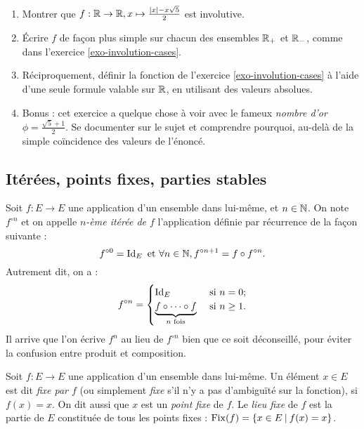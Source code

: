 \begin{exercice}\label{exo-involution-abs}
\begin{enumerate}
\item Montrer que $f : \mathbb{R}\to \mathbb{R}, x\mapsto \frac{|x|-x\sqrt 5}{2}$ est involutive.
\item Écrire $f$ de façon plus simple sur chacun des ensembles $\mathbb{R}_+$ et $\mathbb{R}_-$, comme dans l'exercice \ref{exo-involution-cases}.
\item Réciproquement, définir la fonction de l'exercice \ref{exo-involution-cases} à l'aide d'une seule formule valable sur $\mathbb{R}$, en utilisant des valeurs absolues.
\item Bonus : cet exercice a quelque chose à voir avec le fameux \emph{nombre d'or} $\phi = \frac{\sqrt 5 +1}{2}$. Se documenter sur le sujet et comprendre pourquoi, au-delà de la simple coïncidence des valeurs de l'énoncé.
\end{enumerate}
\end{exercice}



\subsection{Itérées, points fixes, parties stables}

\begin{definition}
Soit $f : E\to E$ une application d'un ensemble dans lui-même, et $n\in \mathbb{N}$. On  note $f^{\circ n}$ et on appelle \emph{$n$-ème itérée de $f$}  l'application définie par récurrence de la façon suivante :
\[ f^{\circ 0} = \operatorname{Id}_E \text{ et } \forall n\in \mathbb{N}, f^{\circ n+1} = f\circ f^{\circ n}.\]
Autrement dit, on a :
\[ 
f^{\circ n} = \begin{cases}
\operatorname{Id}_E & \text{ si } n=0;\\
\underbrace{f\circ \dots \circ f}_{n \text{ fois}} & \text{ si } n\geq 1.
\end{cases}
\]
Il arrive que l'on écrive $f^n$ au lieu de $f^{\circ n}$ bien que ce soit déconseillé, pour éviter la confusion entre produit et composition.
\end{definition}

\begin{definition}
Soit $f : E\to E$ une application d'un ensemble dans lui-même. Un élément $x\in E$ est dit \emph{fixe par $f$} (ou simplement \emph{fixe} s'il n'y a pas d'ambiguïté sur la fonction), si $f(x)=x$. On dit aussi que $x$ est un \emph{point fixe} de $f$. Le \emph{lieu fixe} de $f$ est la partie de $E$ constituée de tous les points fixes : $\operatorname{Fix}(f) = \{x\in E\:|\: f(x)=x \}$.
\end{definition}

